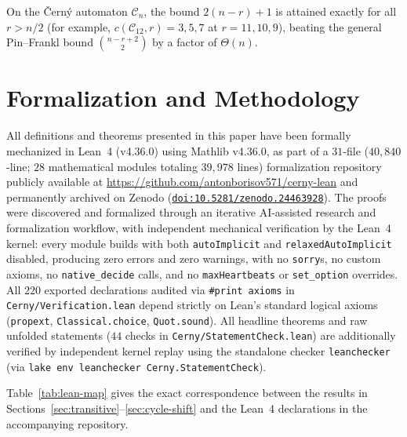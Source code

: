 \documentclass[11pt,a4paper]{article}
\theoremstyle{definition}
\theoremstyle{remark}
\begin{document}
On the \v{C}ern\'y automaton $\mathcal{C}_n$, the bound $2(n - r) + 1$ is attained exactly for all $r > n / 2$ (for example, $c(\mathcal{C}_{12}, r) = 3, 5, 7$ at $r = 11, 10, 9$), beating the general Pin--Frankl bound $\binom{n - r + 2}{2}$ by a factor of $\Theta(n)$.

\section{Formalization and Methodology}\label{sec:formalization}

All definitions and theorems presented in this paper have been formally mechanized in Lean~4 (v4.36.0) using Mathlib v4.36.0, as part of a $31$-file ($40{,}840$-line; $28$ mathematical modules totaling $39{,}978$ lines) formalization repository publicly available at \url{https://github.com/antonborisov571/cerny-lean} and permanently archived on Zenodo (\href{https://doi.org/10.5281/zenodo.24463928}{\texttt{doi:10.5281/zenodo.24463928}}). The proofs were discovered and formalized through an iterative AI-assisted research and formalization workflow, with independent mechanical verification by the Lean~4 kernel: every module builds with both \texttt{autoImplicit} and \texttt{relaxedAutoImplicit} disabled, producing zero errors and zero warnings, with no \texttt{sorry}s, no custom axioms, no \texttt{native\_decide} calls, and no \texttt{maxHeartbeats} or \texttt{set\_option} overrides. All $220$ exported declarations audited via \texttt{\#print axioms} in \texttt{Cerny/Verification.lean} depend strictly on Lean's standard logical axioms (\texttt{propext}, \texttt{Classical.choice}, \texttt{Quot.sound}). All headline theorems and raw unfolded statements ($44$ checks in \texttt{Cerny/StatementCheck.lean}) are additionally verified by independent kernel replay using the standalone checker \texttt{leanchecker} (via \texttt{lake env leanchecker Cerny.StatementCheck}).

Table~\ref{tab:lean-map} gives the exact correspondence between the results in Sections~\ref{sec:transitive}--\ref{sec:cycle-shift} and the Lean~4 declarations in the accompanying repository.
\end{document}
